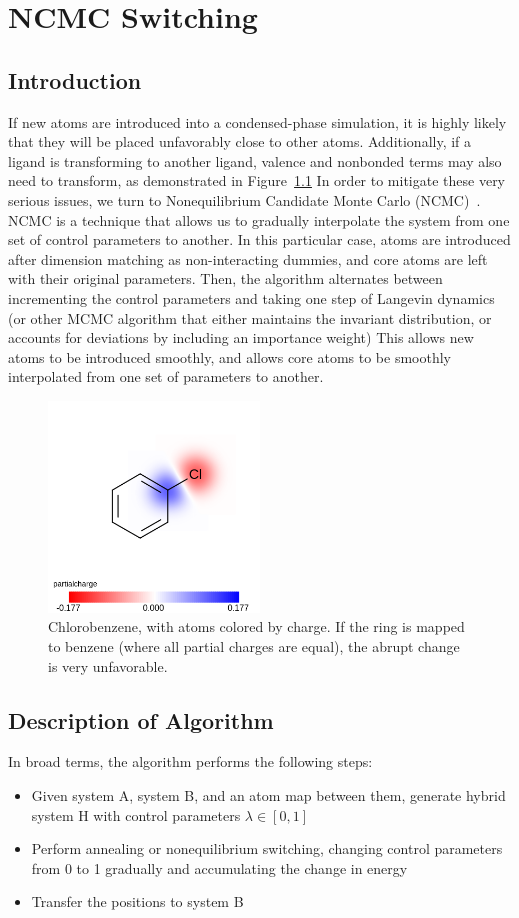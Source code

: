 \chapter{NCMC Switching}

\section{Introduction}
%
If new atoms are introduced into a condensed-phase simulation, it is highly likely that they will be placed unfavorably close to other atoms.
%
Additionally, if a ligand is transforming to another ligand, valence and nonbonded terms may also need to transform, as demonstrated in Figure~\ref{fig:benz_chlorobenz}
%
In order to mitigate these very serious issues, we turn to Nonequilibrium Candidate Monte Carlo (NCMC)~\cite{Nilmeier2011}. 
%
NCMC is a technique that allows us to gradually interpolate the system from one set of control parameters to another.
%
In this particular case, atoms are introduced after dimension matching as non-interacting dummies, and core atoms are left with their original parameters.
%
Then, the algorithm alternates between incrementing the control parameters and taking one step of Langevin dynamics (or other MCMC algorithm that either maintains the invariant distribution, or accounts for deviations by including an importance weight)
%
This allows new atoms to be introduced smoothly, and allows core atoms to be smoothly interpolated from one set of parameters to another.
%
\begin{figure}[H]
    \centering
    \includegraphics[width=0.5\textwidth]{partialcharge-pm.png}
    \caption{Chlorobenzene, with atoms colored by charge. If the ring is mapped to benzene (where all partial charges are equal), the abrupt change is very unfavorable.}
    \label{fig:benz_chlorobenz}
\end{figure}
%
\section{Description of Algorithm}
%
In broad terms, the algorithm performs the following steps:
\begin{itemize}
    \item Given system A, system B, and an atom map between them, generate hybrid system H with control parameters $\lambda \in [0,1]$
    \item Perform annealing or nonequilibrium switching, changing control parameters from 0 to 1 gradually and accumulating the change in energy
    \item Transfer the positions to system B
\end{itemize}
%

